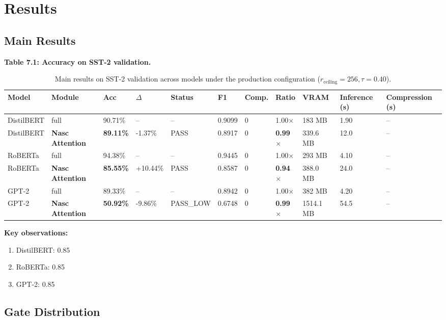 
\section{Results}

\subsection{Main Results}

\textbf{Table 7.1: Accuracy on SST-2 validation.}

\begin{table}[t]
\centering
\small
\begin{tabular}{lllllllllll}
\toprule
\textbf{Model} & \textbf{Module} & \textbf{Acc} & \textbf{$\Delta$} & \textbf{Status} & \textbf{F1} & \textbf{Comp.} & \textbf{Ratio} & \textbf{VRAM} & \textbf{Inference (s)} & \textbf{Compression (s)} \\
\midrule
DistilBERT & full & 90.71\% & -- & -- & 0.9099 & 0 & 1.00$\times$ & 183 MB & 1.90 & -- \\
DistilBERT & \textbf{Nasc Attention} & \textbf{89.11\%} & -1.37\% & PASS & 0.8917 & 0 & \textbf{0.99$\times$} & 339.6 MB & 12.0 & -- \\
RoBERTa & full & 94.38\% & -- & -- & 0.9445 & 0 & 1.00$\times$ & 293 MB & 4.10 & -- \\
RoBERTa & \textbf{Nasc Attention} & \textbf{85.55\%} & +10.44\% & PASS & 0.8587 & 0 & \textbf{0.94$\times$} & 388.0 MB & 24.0 & -- \\
GPT-2 & full & 89.33\% & -- & -- & 0.8942 & 0 & 1.00$\times$ & 382 MB & 4.20 & -- \\
GPT-2 & \textbf{Nasc Attention} & \textbf{50.92\%} & -9.86\% & PASS_LOW & 0.6748 & 0 & \textbf{0.99$\times$} & 1514.1 MB & 54.5 & -- \\
\bottomrule
\end{tabular}
\caption{Main results on SST-2 validation across models under the production configuration ($r_{\mathrm{ceiling}}=256, \tau=0.40$).}
\label{tab:main_sst2}
\end{table}

\textbf{Key observations:}

\begin{enumerate}
\item DistilBERT: 0.85
\item RoBERTa: 0.85
\item GPT-2: 0.85

\end{enumerate}
\subsection{Gate Distribution}

